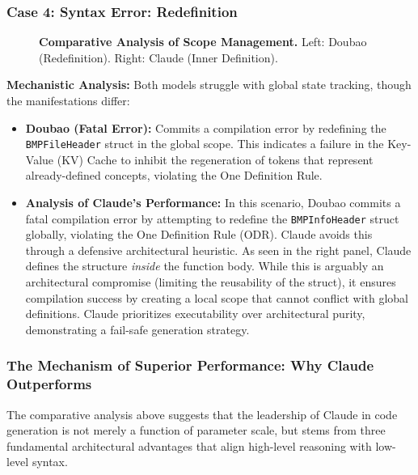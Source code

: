\documentclass{article}
\theoremstyle{plain}
\theoremstyle{definition}
\theoremstyle{remark}
\begin{document}
\subsubsection{Case 4: Syntax Error: Redefinition}
\begin{figure}[H]
    \centering
    \caption{\textbf{Comparative Analysis of Scope Management.} Left: Doubao (Redefinition). Right: Claude (Inner Definition).}
    \label{fig:compare_4}
\end{figure}

\textbf{Mechanistic Analysis:}
Both models struggle with global state tracking, though the manifestations differ:
\begin{itemize}
    \item \textbf{Doubao (Fatal Error):} Commits a compilation error by redefining the \texttt{BMPFileHeader} struct in the global scope. This indicates a failure in the Key-Value (KV) Cache to inhibit the regeneration of tokens that represent already-defined concepts, violating the One Definition Rule.
    
    \item \textbf{Analysis of Claude's Performance:} In this scenario, Doubao commits a fatal compilation error by attempting to redefine the \texttt{BMPInfoHeader} struct globally, violating the One Definition Rule (ODR). Claude avoids this through a defensive architectural heuristic. As seen in the right panel, Claude defines the structure \textit{inside} the function body. While this is arguably an architectural compromise (limiting the reusability of the struct), it ensures compilation success by creating a local scope that cannot conflict with global definitions. Claude prioritizes executability over architectural purity, demonstrating a fail-safe generation strategy.
\end{itemize}

\subsubsection{The Mechanism of Superior Performance: Why Claude Outperforms}
\label{sec:claude_superiority}

The comparative analysis above suggests that the leadership of Claude in code generation is not merely a function of parameter scale, but stems from three fundamental architectural advantages that align high-level reasoning with low-level syntax.
\end{document}
